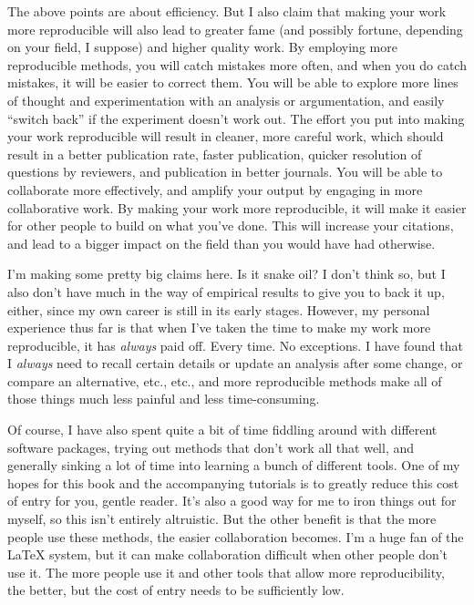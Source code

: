 \documentclass{book}
\begin{document}
The above points are about efficiency. But I also claim that making your work more reproducible will also lead to greater fame (and possibly fortune, depending on your field, I suppose) and higher quality work.  By employing more reproducible methods, you will catch mistakes more often, and when you do catch mistakes, it will be easier to correct them. You will be able to explore more lines of thought and experimentation with an analysis or argumentation, and easily ``switch back'' if the experiment doesn't work out. The effort you put into making your work reproducible will result in cleaner, more careful work, which should result in a better publication rate, faster publication, quicker resolution of questions by reviewers, and publication in better journals. You will be able to collaborate more effectively, and amplify your output by engaging in more collaborative work.  By making your work more reproducible, it will make it easier for other people to build on what you've done. This will increase your citations, and lead to a bigger impact on the field than you would have had otherwise.

I'm making some pretty big claims here.  Is it snake oil?  I don't think so, but I also don't have much in the way of empirical results to give you to back it up, either, since my own career is still in its early stages. However, my personal experience thus far is that when I've taken the time to make my work more reproducible, it has \emph{always} paid off.  Every time.  No exceptions.  I have found that I \emph{always} need to recall certain details or update an analysis after some change, or compare an alternative, etc., etc., and more reproducible methods make all of those things much less painful and less time-consuming.

Of course, I have also spent quite a bit of time fiddling around with different software packages, trying out methods that don't work all that well, and generally sinking a lot of time into learning a bunch of different tools.  One of my hopes for this book and the accompanying tutorials is to greatly reduce this cost of entry for you, gentle reader.  It's also a good way for me to iron things out for myself, so this isn't entirely altruistic. But the other benefit is that the more people use these methods, the easier collaboration becomes.  I'm a huge fan of the \LaTeX{} system, but it can make collaboration difficult when other people don't use it.  The more people use it and other tools that allow more reproducibility, the better, but the cost of entry needs to be sufficiently low.
\end{document}

